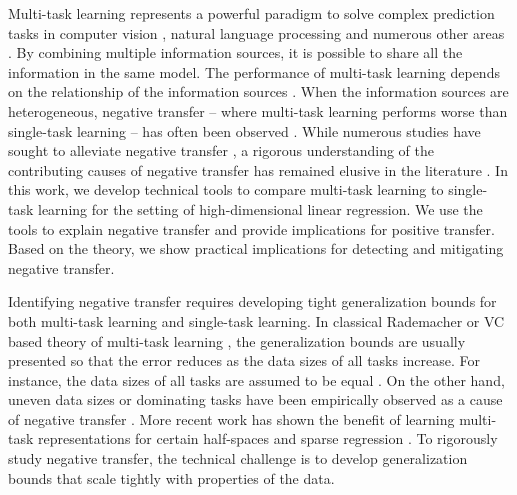 Multi-task learning represents a powerful paradigm to solve complex prediction tasks in computer vision \cite{chexnet17,ZSSGM18}, natural language processing \cite{GLUE,superglue} and numerous other areas \cite{ZY17}.
By combining multiple information sources, it is possible to share all the information in the same model.
The performance of multi-task learning depends on the relationship of the information sources \cite{C97}.
When the information sources are heterogeneous, negative transfer -- where multi-task learning performs worse than single-task learning -- has often been observed \cite{AP16,BS17}.
While numerous studies have sought to alleviate negative transfer \cite{ZY17}, a rigorous understanding of the contributing causes of negative transfer has remained elusive in the literature \cite{R17}.
In this work, we develop technical tools to compare multi-task learning to single-task learning for the setting of high-dimensional linear regression. %
We use the tools to explain negative transfer and provide implications for positive transfer.
Based on the theory, we show practical implications for detecting and mitigating negative transfer.

Identifying negative transfer requires developing tight generalization bounds for both multi-task learning and single-task learning.
In classical Rademacher or VC based theory of multi-task learning \cite{B00,AZ05,M06}, the generalization bounds are usually presented so that the error reduces as the data sizes of all tasks increase.
For instance, the data sizes of all tasks are assumed to be equal \cite{B00}.
On the other hand, uneven data sizes or dominating tasks have been empirically observed as a cause of negative transfer \cite{YKGLHF20}.
More recent work has shown the benefit of learning multi-task representations for certain half-spaces \cite{MPR16} and sparse regression \cite{LPTV09,LPVT11}.
To rigorously study negative transfer, the technical challenge is to develop generalization bounds that scale tightly with properties of the data.


